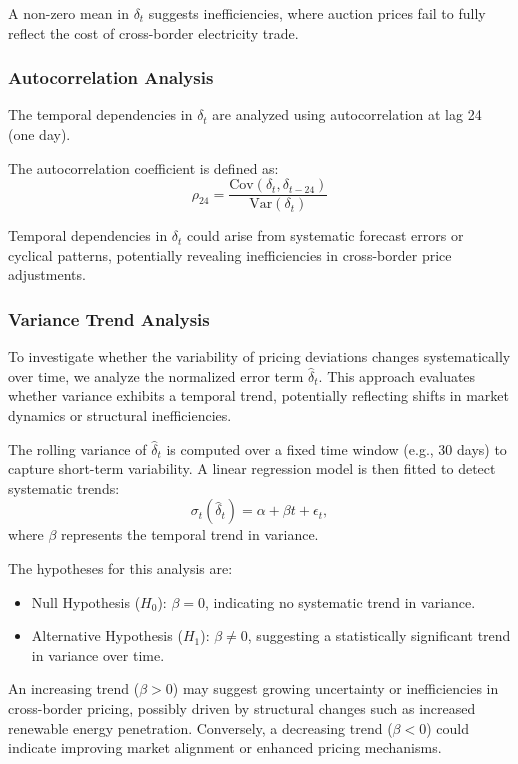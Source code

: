 \documentclass[12pt]{article}
\begin{document}
A non-zero mean in $\delta_t$ suggests inefficiencies, where auction prices fail to fully reflect the cost of cross-border electricity trade.

\subsubsection*{Autocorrelation Analysis}

The temporal dependencies in $\delta_t$ are analyzed using autocorrelation at lag 24 (one day).

The autocorrelation coefficient is defined as:
\begin{equation}
    \rho_{24} = \frac{\text{Cov}(\delta_t, \delta_{t-24})}{\text{Var}(\delta_t)}
\end{equation}

Temporal dependencies in $\delta_t$ could arise from systematic forecast errors or cyclical patterns, potentially revealing inefficiencies in cross-border price adjustments.

\subsubsection*{Variance Trend Analysis}

To investigate whether the variability of pricing deviations changes systematically over time, we analyze the normalized error term $\hat{\delta}_t$. This approach evaluates whether variance exhibits a temporal trend, potentially reflecting shifts in market dynamics or structural inefficiencies. 

The rolling variance of $\hat{\delta}_t$ is computed over a fixed time window (e.g., 30 days) to capture short-term variability. A linear regression model is then fitted to detect systematic trends:
\begin{equation}
    \sigma_t(\hat{\delta}_t) = \alpha + \beta t + \epsilon_t,
\end{equation}
where $\beta$ represents the temporal trend in variance. 

The hypotheses for this analysis are:
\begin{itemize}
    \item Null Hypothesis ($H_0$): $\beta = 0$, indicating no systematic trend in variance.
    \item Alternative Hypothesis ($H_1$): $\beta \neq 0$, suggesting a statistically significant trend in variance over time.
\end{itemize}

An increasing trend ($\beta > 0$) may suggest growing uncertainty or inefficiencies in cross-border pricing, possibly driven by structural changes such as increased renewable energy penetration. Conversely, a decreasing trend ($\beta < 0$) could indicate improving market alignment or enhanced pricing mechanisms.
\end{document}
